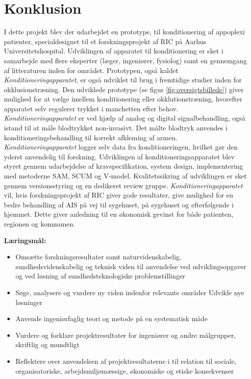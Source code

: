 \chapter{Konklusion}
I dette projekt blev der udarbejdet en prototype, til konditionering af appoplexi patienter, specialdesignet til et forskningsprojekt af RIC på Aarhus Universitetshospital. Udviklingen af apparatet til konditionering er sket i samarbejde med flere eksperter (læger, ingeniører, fysiolog) samt en gennemgang af litteraturen inden for området. Prototypen, også kaldet \textit{Konditioneringapparatet}, er også udviklet til brug i fremtidige studier inden for okklusionstræning.
Den udviklede prototype (se figur \ref{fig:oversigtsbillede}) giver mulighed for at vælge imellem konditionering eller okklutionstræning, hvorefter apparatet selv regulerer trykket i manchetten efter behov. \textit{Konditioneringapparatet} er ved hjælp af analog og digital signalbehandling, også istand til at måle blodtrykket non-invasivt. Det målte blodtryk anvendes i konditioneringsbehandling til korrekt afkleming af armen. \textit{Konditioneringapparatet} logger selv data fra konditioneringen, hvilket gør den yderst anvendelig til forskning. 
Udviklingen af konditioneringsapparatet blev styret gennem udarbejdelse af kravspecifikation, system design, implementering med metoderne SAM, SCUM og V-model. Kvalitetssikring af udviklingen er sket gennem versionsstyring og en dedikeret review gruppe.
\textit{Konditioneringapparatet} vil, hvis forskningsprojekt af RIC giver gode resultater, give mulighed for en bedre behandling af AIS på vej til sygehuset, på sygehuset og efterfølgende i hjemmet. Dette giver anledning til en økonomisk gevinst for både patienten, regionen og kommunen.


\textbf{Læringsmål:}
\begin{itemize}
	\item Omsætte forskningsresultater samt naturvidenskabelig, sundhedsvidenskabelig og teknisk viden til anvendelse ved udviklingsopgaver og ved løsning af sundhedsteknologiske problemstillinger
	\item Søge, analysere og vurdere ny viden indenfor relevante områder
	Udvikle nye løsninger
	\item Anvende ingeniørfaglig teori og metode på en systematisk måde
	\item Vurdere og forklare projektresultater for ingeniører og andre målgrupper, skriftlig og mundtligt
	
	\item Reflektere over anvendelsen af projektresultaterne i til relation til sociale, organisatoriske, arbejdsmiljømæssige, økonomiske og etiske konsekvenser
	
\end{itemize}




